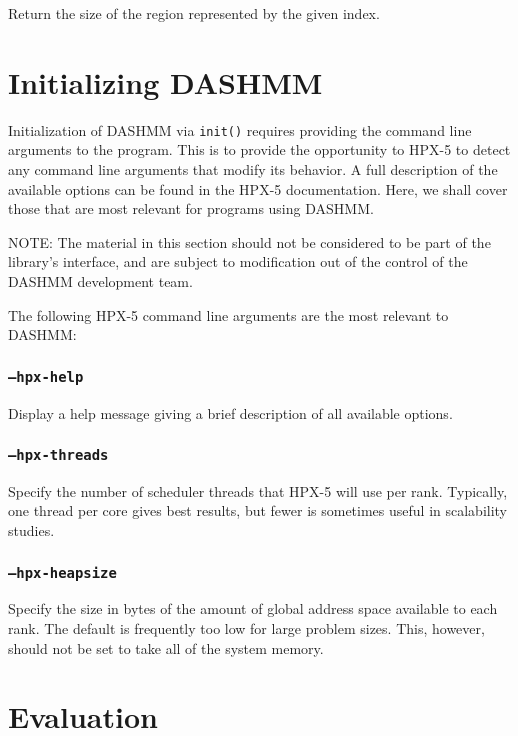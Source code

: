 Return the size of the region represented by the given index.



\section{Initializing DASHMM}

Initialization of DASHMM via \texttt{init()} requires providing the command
line arguments to the program. This is to provide the opportunity to HPX-5 to
detect any command line arguments that modify its behavior. A full description
of the available options can be found in the HPX-5 documentation. Here, we
shall cover those that are most relevant for programs using DASHMM.

NOTE: The material in this section should not be considered to be part of the
library's interface, and are subject to modification out of the control of
the DASHMM development team.

The following HPX-5 command line arguments are the most relevant to DASHMM:

\subsubsection{\texttt{--hpx-help}}

Display a help message giving a brief description of all available options.

\subsubsection{\texttt{--hpx-threads}}

Specify the number of scheduler threads that HPX-5 will use per rank.
Typically, one thread per core gives best results, but fewer is sometimes
useful in scalability studies.

\subsubsection{\texttt{--hpx-heapsize}}

Specify the size in bytes of the amount of global address space available to
each rank. The default is frequently too low for large problem sizes. This,
however, should not be set to take all of the system memory.



\section{Evaluation}

